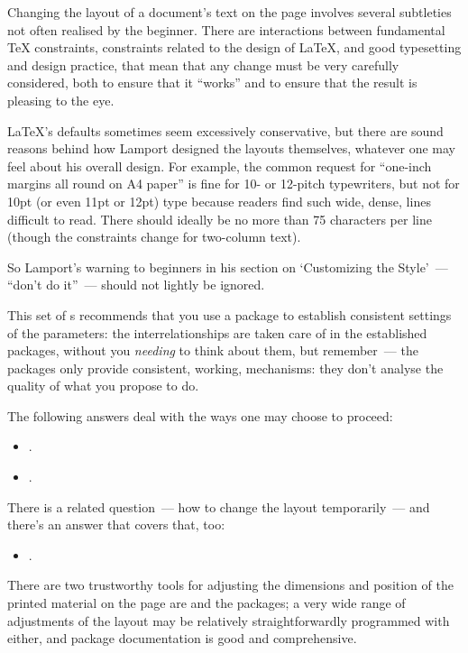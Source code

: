 
Changing the layout of a document's text on the page involves several
subtleties not often realised by the beginner.  There are interactions
between fundamental \TeX{} constraints, constraints related to the
design of \LaTeX{}, and good typesetting and design practice, that
mean that any change must be very carefully considered, both to ensure
that it ``works'' and to ensure that the result is pleasing to the
eye.

\LaTeX{}'s defaults sometimes seem excessively conservative,
but there are sound reasons behind how Lamport designed the layouts
themselves, whatever one may feel about his overall design.  For
example, the common request for ``one-inch margins all round on A4
paper'' is fine for 10- or 12-pitch typewriters, but not for 10pt (or
even 11pt or 12pt) type because readers find such wide, dense, lines
difficult to read.  There should ideally be no more than 75 characters
per line (though the constraints change for two-column text).

So Lamport's warning to beginners in his section on `Customizing the
Style'~--- ``don't do it''~--- should not lightly be ignored.

This set of s recommends that you use a package to establish
consistent settings of the parameters: the interrelationships are
taken care of in the established packages, without you \emph{needing}
to think about them, but remember~--- the packages only provide
consistent, working, mechanisms: they don't analyse the quality of
what you propose to do.

The following answers deal with the ways one may choose to proceed:
\begin{itemize}
\item {}.
\item {}.
\end{itemize}
There is a related question~--- how to change the layout
temporarily~--- and there's an answer that covers that, too:
\begin{itemize}
\item {}.
\end{itemize}


There are two trustworthy tools for adjusting the dimensions and position of the
printed material on the page are  and the
 packages; a very
wide range of adjustments of the layout may be relatively
straightforwardly programmed with either, and package documentation is good and
comprehensive.

